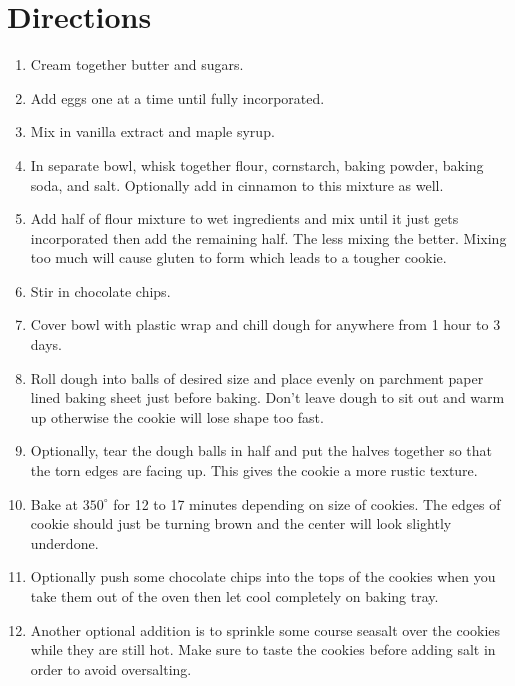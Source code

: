 \documentclass{report}
\theoremstyle{plain} %
\theoremstyle{definition} %
\theoremstyle{plain} %
\begin{document}
\section*{Directions}
\begin{enumerate}
\item Cream together butter and sugars.
\item Add eggs one at a time until fully incorporated.
\item Mix in vanilla extract and maple syrup.
\item In separate bowl, whisk together flour, cornstarch, baking powder, baking soda, and salt. Optionally add in cinnamon to this mixture as well.
\item Add half of flour mixture to wet ingredients and mix until it just gets incorporated then add the remaining half. The less mixing the better. Mixing too much will cause gluten to form which leads to a tougher cookie.
\item Stir in chocolate chips.
\item Cover bowl with plastic wrap and chill dough for anywhere from 1 hour to 3 days.
\item Roll dough into balls of desired size and place evenly on parchment paper lined baking sheet just before baking. Don't leave dough to sit out and warm up otherwise the cookie will lose shape too fast.
\item Optionally, tear the dough balls in half and put the halves together so that the torn edges are facing up. This gives the cookie a more rustic texture.
\item Bake at $350^\circ$ for 12 to 17 minutes depending on size of cookies. The edges of cookie should just be turning brown and the center will look slightly underdone.
\item Optionally push some chocolate chips into the tops of the cookies when you take them out of the oven then let cool completely on baking tray.
\item Another optional addition is to sprinkle some course seasalt over the cookies while they are still hot. Make sure to taste the cookies before adding salt in order to avoid oversalting.
\end{enumerate}
\end{document}
